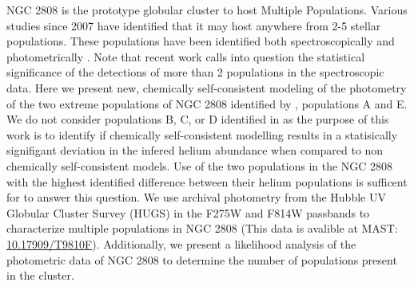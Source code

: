 NGC 2808 is the prototype globular cluster to host Multiple Populations.
Various studies since 2007 have identified that it may host anywhere from 2-5
stellar populations. These populations have been identified both
spectroscopically \citep[i.e.][]{Carretta2004, Carretta2006, Carretta2010,
Gratton2011, Carretta2015, Hong2021} and photometrically
\citep[i.e.][]{Piotto2007, Piotto2015, Milone2015, Milone2017, Pasquato2019}.
Note that recent work \citep{Valle2022} calls into question the statistical
significance of the detections of more than 2 populations in the spectroscopic
data. Here we present new, chemically self-consistent modeling of the
photometry of the two extreme populations of NGC 2808 identified by
\citet{Milone2015}, populations A and E. We do not consider populations B, C,
or D identified in \citet{Milone2015} as the purpose of this work is to
identify if chemically self-consistent modelling results in a statisically
signifigant deviation in the infered helium abundance when compared to non
chemically self-consistent models. Use of the two populations in the NGC 2808
with the highest identified difference between their helium populations is
sufficent for to answer this question.  We use archival photometry from the
Hubble UV Globular Cluster Survey (HUGS) \citep{Piotto2015, Milone2017} in the
F275W and F814W passbands to characterize multiple populations in NGC 2808
\citep{Milone2015, Milone2015b} (This data is avalible at MAST:
\href{https://archive.stsci.edu/doi/resolve/resolve.html?doi=10.17909/T9810F}{10.17909/T9810F}).
Additionally, we present a likelihood analysis of the photometric data of NGC
2808 to determine the number of populations present in the cluster.


